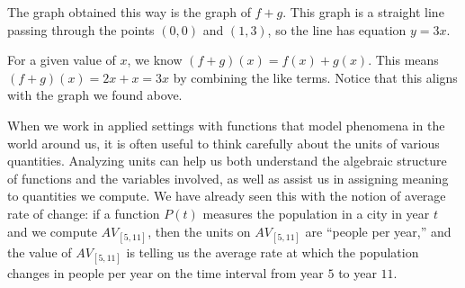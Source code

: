 \documentclass{ximera}
\begin{document}
  	\begin{image}
	\end{image}
	The graph obtained this way is the graph of $f+g$.  This graph is a straight line passing through the points $(0,0)$ and $(1,3)$, so the line has
	equation $y=3x$.
	
	For a given value of $x$, we know $(f+g)(x) = f(x)+g(x)$. This means $(f+g)(x) =2x + x = 3x$ by combining the like terms. Notice that this 
	aligns with the graph we found above.

	
	When we work in applied settings with functions that model phenomena in the world around us, it is often useful to think carefully about the units of 
	various quantities. Analyzing units can help us both understand the algebraic structure of functions and the variables involved, as well as assist us in 
	assigning meaning to quantities we compute. We have already seen this with the notion of average rate of change: if a function $P(t)$ measures the 
	population in a city in year $t$ and we compute $AV_{[5, 11]}$, then the units on $AV_{[5, 11]}$ are ``people per year,'' and the value of 
	$AV_{[5, 11]}$ is telling us the average rate at which the population changes in people per year on the time interval from year $5$ to year $11$.
\end{document}
